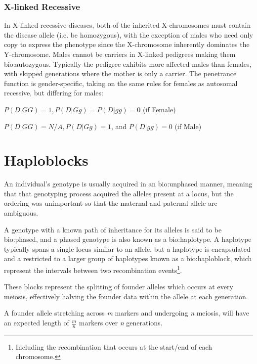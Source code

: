 \subsubsection{X-linked Recessive}

\label{ref:back:xlinkrec}

In X-linked recessive diseases, both of the inherited X-chromosomes must contain the disease allele (i.e. be homozygous), with the exception of males who need only copy to express the phenotype since the X-chromosome inherently dominates the Y-chromosome.  Males cannot be carriers in X-linked pedigrees making them \gls{bio:autozygous}.
Typically the pedigree exhibits more affected males than females, with skipped generations where the mother is only a carrier. 
The penetrance function is gender-specific, taking on the same rules for females as autosomal recessive, but differing for males:

\begin{description}
\item{\hfill \(P(D|GG)=1, P(D|Gg) = P(D|gg)=0\) \hfill(if Female) }
\item{\hfill \(P(D|GG)=N/A, P(D|Gg)=1\), and \(P(D|gg)=0\) \hfill (if Male)}
\end{description}


\section{Haploblocks}

An individual's genotype is usually acquired in an \gls{bio:unphased} manner, meaning that that genotyping process acquired the alleles present at a locus, but the ordering was unimportant so that the maternal and paternal allele are ambiguous.

A genotype with a known path of inheritance for its alleles is said to be \gls{bio:phased}, and a phased genotype is also known as a \gls{bio:haplotype}.  A haplotype typically spans a single locus similar to an allele, but a haplotype is encapsulated and a restricted to a larger group of haplotypes known as a \gls{bio:haploblock}, which represent the intervals between two recombination events\footnote{Including the recombination that occurs at the start/end of each chromosome.}.

These blocks represent the splitting of founder alleles which occurs at every meiosis, effectively halving the founder data within the allele at each generation. 

A founder allele stretching across \textit{m} markers and undergoing \textit{n} meiosis, will have an expected length of \(\frac{m}{n}\) markers over \textit{n} generations.

